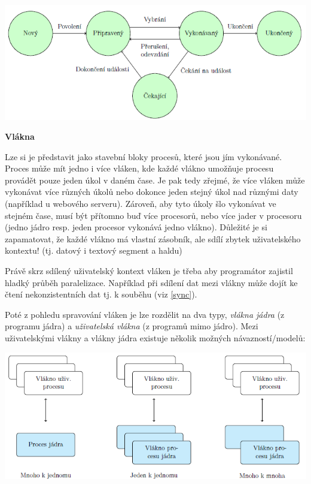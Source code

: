 \begin{center}
    \includegraphics[scale=1]{BPC-SOS/images/proc_states.png}
\end{center}

\begin{Large}
    \vspace{0,5cm}
    \textbf{Vlákna}
\end{Large}

Lze si je představit jako stavební bloky procesů, které jsou jím vykonávané. Proces může mít jedno i více vláken, kde každé vlákno umožňuje procesu provádět pouze jeden úkol v daném čase. Je pak tedy zřejmé, že více vláken může vykonávat více různých úkolů nebo dokonce jeden stejný úkol nad různými daty (například u webového serveru). Zároveň, aby tyto úkoly šlo vykonávat ve stejném čase, musí být přítomno buď více procesorů, nebo více jader v procesoru (jedno jádro resp. jeden procesor vykonává jedno vlákno). Důležité je si zapamatovat, že každé vlákno má vlastní zásobník, ale sdílí zbytek uživatelského kontextu! (tj. datový i textový segment a haldu)

\vspace{0,5cm}

Právě skrz sdílený uživatelský kontext vláken je třeba aby programátor zajistil hladký průběh paralelizace. Například při sdílení dat mezi vlákny může dojít ke čtení nekonzistentních dat tj. k souběhu (viz \ref{sync}). 

\vspace{0,5cm}

Poté z pohledu spravování vláken je lze rozdělit na dva typy, \textit{vlákna jádra} (z programu jádra) a \textit{uživatelská vlákna} (z programů mimo jádro). Mezi uživatelskými vlákny a vlákny jádra existuje několik možných návazností/modelů:

\begin{center}
    \includegraphics[scale=1]{BPC-SOS/images/thread_models.png}
\end{center}

